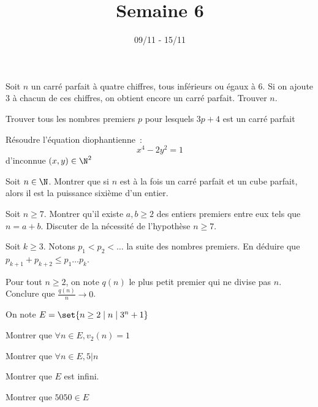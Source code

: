 \documentclass[11pt,a4paper]{article}
\begin{document}
\title{Semaine 6}
\author{}
\date{09/11 - 15/11 }

\maketitle

\begin{exercise}
    Soit $n$ un carré parfait à quatre chiffres, tous inférieurs ou égaux à 6. Si on ajoute 3 à chacun de ces chiffres, on obtient encore un carré parfait. Trouver $n$.
\end{exercise}

\begin{exercise}
    Trouver tous les nombres premiers $p$ pour lesquels $3p+4$ est un carré parfait
\end{exercise}

\begin{exercise}
    Résoudre l'équation diophantienne~:
        \[x^4 - 2 y^2 = 1\]
    d'inconnue $(x,y) \in \N^2$
\end{exercise}

\begin{exercise}
    Soit $n \in \N$. Montrer que si $n$ est à la fois un carré parfait et un cube parfait, alors il est la puissance sixième d'un entier.
\end{exercise}

\begin{exercise}
\begin{questions}
\item Soit $n\ge 7$. Montrer qu'il existe $a,b\ge 2$ des entiers premiers entre eux tels que $n=a+b$. Discuter de la nécessité de l'hypothèse $n\ge 7$.
\item Soit $k\ge 3$. Notons $p_1<p_2<\ldots$ la suite des nombres premiers. En déduire que $p_{k+1}+p_{k+2}\le p_1 \ldots p_k$.
\item Pour tout $n\ge 2$, on note $q(n)$ le plus petit premier qui ne divise pas $n$. Conclure que $\frac{q(n)}{n}\to 0$.
\end{questions}
\end{exercise}

\begin{exercise}
On note $E=\set{n\ge2\mid n\mid 3^n+1}$
\begin{questions}
\item Montrer que $\forall n\in E, v_2(n)=1$
\item Montrer que $\forall n\in E, 5|n$
\item Montrer que $E$ est infini.
\item Montrer que $5050\in E$
\end{questions}
\end{exercise}
\end{document}
